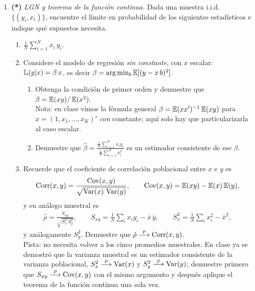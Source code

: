 \documentclass[letterpaper,11pt]{article}
\begin{document}
\begin{enumerate}[itemsep=1.2em]
\item \textbf{(*)} \emph{LGN y teorema de la función continua.} Dada una muestra i.i.d.\
    $\{(y_i,x_i)\}$, encuentre el límite en probabilidad de los siguientes estadísticos e
    indique qué supuestos necesita.
    \begin{enumerate}
        \item $\displaystyle \frac{1}{N}\sum_{i=1}^N x_i\,y_i$.
        \item Considere el modelo de regresión \emph{sin constante}, con $x$ escalar:
              $\operatorname{\mathbb{L}}(y|x)=\beta\,x$, es decir $\beta=\arg\min_b \operatorname{\mathbb{E}}[(y-x\,b)^2]$.
              \begin{enumerate}[label=(\roman*)]
                  \item Obtenga la condición de primer orden y demuestre que
                        $\beta=\operatorname{\mathbb{E}}(xy)/\operatorname{\mathbb{E}}(x^2)$. \\
                        Nota: en clase vimos la fórmula general
                        $\beta=\operatorname{\mathbb{E}}(xx')^{-1}\operatorname{\mathbb{E}}(xy)$ para $x=(1,x_1,\dots,x_K)'$ \emph{con}
                        constante; aquí solo hay que particularizarla al caso escalar.
                  \item Demuestre que $\displaystyle
                        \hat\beta=\frac{\frac{1}{N}\sum_{i=1}^N x_i y_i}{\frac{1}{N}\sum_{i=1}^N x_i^2}$
                        es un estimador consistente de ese $\beta$.
              \end{enumerate}
        \item Recuerde que el coeficiente de correlación poblacional entre $x$ e $y$ es
              \begin{align*}
              \operatorname{Corr}(x,y)=\frac{\operatorname{Cov}(x,y)}{\sqrt{\operatorname{Var}(x)\,\operatorname{Var}(y)}},
              \qquad \operatorname{Cov}(x,y)=\operatorname{\mathbb{E}}(xy)-\operatorname{\mathbb{E}}(x)\operatorname{\mathbb{E}}(y),
              \end{align*}
              y su análogo muestral es
              \begin{align*}
              \hat\rho = \frac{S_{xy}}{\sqrt{S_x^2\,S_y^2}},
              \qquad
              S_{xy}=\frac{1}{N}\sum_i x_i y_i-\bar x\,\bar y,
              \qquad
              S_x^2=\frac{1}{N}\sum_i x_i^2-\bar x^2,
              \end{align*}
              y análogamente $S_y^2$. Demuestre que $\hat\rho\stackrel{p}{\longrightarrow}\operatorname{Corr}(x,y)$. \\
              Pista: no necesita volver a los cinco promedios muestrales. En clase ya se
              demostró que la varianza muestral es un estimador consistente de la varianza
              poblacional, $S_x^2\stackrel{p}{\longrightarrow}\operatorname{Var}(x)$ y $S_y^2\stackrel{p}{\longrightarrow}\operatorname{Var}(y)$; demuestre primero que
              $S_{xy}\stackrel{p}{\longrightarrow}\operatorname{Cov}(x,y)$ con el mismo argumento y después aplique el teorema de la
              función continua una sola vez.
    \end{enumerate}


\end{enumerate}
\end{document}
